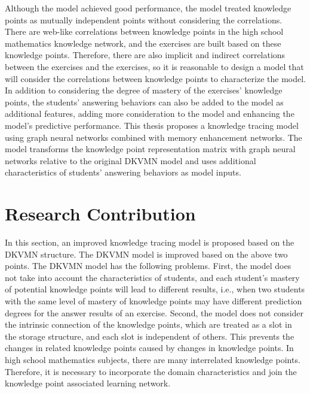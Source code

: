 Although the model achieved good performance, the model treated knowledge points as mutually independent points without considering the correlations. There are web-like correlations between knowledge points in the high school mathematics knowledge network, and the exercises are built based on these knowledge points. Therefore, there are also implicit and indirect correlations between the exercises and the exercises, so it is reasonable to design a model that will consider the correlations between knowledge points to characterize the model. In addition to considering the degree of mastery of the exercises' knowledge points, the students' answering behaviors can also be added to the model as additional features, adding more consideration to the model and enhancing the model's predictive performance. This thesis proposes a knowledge tracing model using graph neural networks combined with memory enhancement networks. The model transforms the knowledge point representation matrix with graph neural networks relative to the original DKVMN model and uses additional characteristics of students' answering behaviors as model inputs.

\section{Research Contribution}
In this section, an improved knowledge tracing model is proposed based on the DKVMN structure. The DKVMN model is improved based on the above two points. The DKVMN model has the following problems. First, the model does not take into account the characteristics of students, and each student's mastery of potential knowledge points will lead to different results, i.e., when two students with the same level of mastery of knowledge points may have different prediction degrees for the answer results of an exercise. Second, the model does not consider the intrinsic connection of the knowledge points, which are treated as a slot in the storage structure, and each slot is independent of others. This prevents the changes in related knowledge points caused by changes in knowledge points. In high school mathematics subjects, there are many interrelated knowledge points. Therefore, it is necessary to incorporate the domain characteristics and join the knowledge point associated learning network.

